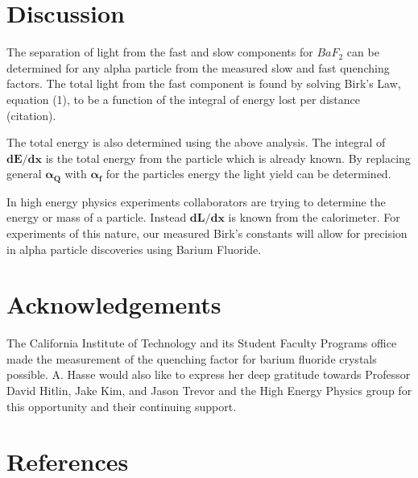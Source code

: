 \documentclass[aip, jmp, amssymb, amsmath, reprint, floatfix]{revtex4-1}
\begin{document}
\section{\label{sec:level1}Discussion}

The separation of light from the fast and slow components for $BaF_2$ can be determined for any alpha particle from the measured slow and fast quenching factors. The total light from the fast component is found by solving Birk's Law, equation (1), to be a function of the integral of energy lost per distance (citation). 


The total energy is also determined using the above analysis. The integral of $\bm{dE/dx}$ is the total energy from the particle which is already known. By replacing general $\bm{\alpha_Q}$ with $\bm{\alpha_f}$ for the particles energy the light yield can be determined. 

In high energy physics experiments collaborators are trying to determine the energy or mass of a particle. Instead $\bm{dL/dx}$ is known from the calorimeter. For experiments of this nature, our measured Birk's constants will allow for precision in alpha particle discoveries using Barium Fluoride. 

\section{\label{sec:level1}Acknowledgements}

The California Institute of Technology and its Student Faculty Programs office made the measurement of the quenching factor for barium fluoride crystals possible. A. Hasse would also like to express her deep gratitude towards Professor David Hitlin, Jake Kim, and Jason Trevor and the High Energy Physics group for this opportunity and their continuing support. 


\section{\label{sec:level1}References}
\end{document}
